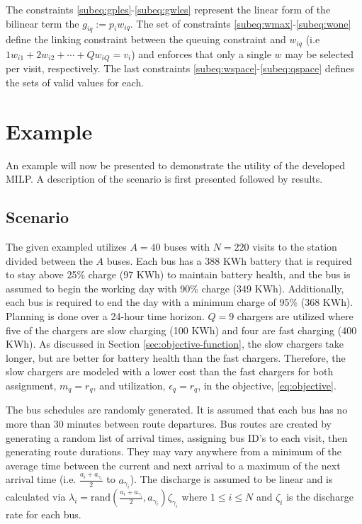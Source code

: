 \documentclass[letterpaper, 10pt, conference]{IEEEtran}
\begin{document}
The constraints \eqref{subeq:gples}-\eqref{subeq:gwles} represent the linear form of the bilinear term the $g_{iq} :=
p_i w_{iq}$. The set of constraints \eqref{subeq:wmax}-\eqref{subeq:wone} define the linking constraint between the
queuing constraint and $w_{iq}$ (i.e $1w_{i1} + 2w_{i2} + \cdots + Qw_{iQ} = v_i$) and enforces that only a single $w$ may be
selected per visit, respectively. The last constraints \eqref{subeq:wspace}-\eqref{subeq:qspace} defines the sets of
valid values for each.

%

\section{Example}
\label{sec:example}

An example will now be presented to demonstrate the utility of the developed MILP. A description of the scenario is
first presented followed by results.

\subsection{Scenario}
The given exampled utilizes $A = 40$ buses with $N = 220$ visits to the station divided between the $A$ buses. Each bus
has a 388 KWh battery that is required to stay above 25\% charge (97 KWh) to maintain battery health, and the bus is
assumed to begin the working day with 90\% charge (349 KWh). Additionally, each bus is required to end the day with a
minimum charge of 95\% (368 KWh). Planning is done over a 24-hour time horizon. $Q = 9$ chargers are utilized where five
of the chargers are slow charging (100 KWh) and four are fast charging (400 KWh). As discussed in Section
\ref{sec:objective-function}, the slow chargers take longer, but are better for battery health than the fast chargers.
Therefore, the slow chargers are modeled with a lower cost than the fast chargers for both assignment, $m_q = r_q$, and
utilization, $\epsilon_q = r_q$, in the objective, \eqref{eq:objective}.

The bus schedules are randomly generated. It is assumed that each bus has no more than 30 minutes between route
departures. Bus routes are created by generating a random list of arrival times, assigning bus ID's to each visit, then
generating route durations. They may vary anywhere from a minimum of the average time between the current and next
arrival to a maximum of the next arrival time (i.e. $\frac{a_i + a_{\gamma_i}}{2}$ to $a_{\gamma_i}$). The discharge is assumed to
be linear and is calculated via $\lambda_i = \text{rand}(\frac{a_i + a_{\gamma_i}}{2},a_{\gamma_i})\zeta_{\gamma_i}$ where $1 \leq i \leq N$ and $\zeta_i$
is the discharge rate for each bus.
\end{document}
